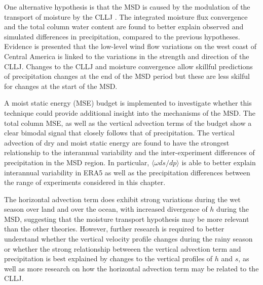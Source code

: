 One alternative hypothesis is that the MSD is caused by the modulation of the transport of moisture by the CLLJ \citep{herrera2015,zermeno2019,martinez2019}. The integrated moisture flux convergence and the total column water content are found to better explain observed and simulated differences in precipitation, compared to the previous hypotheses. Evidence is presented that the low-level wind flow variations on the west coast of Central America is linked to the variations in the strength and direction of the CLLJ. 
Changes to the CLLJ and moisture convergence allow skillful predictions of precipitation changes at the end of the MSD period but these are less skilful for changes at the start of the MSD. 


A moist static energy (MSE) budget is implemented to investigate whether this technique could provide additional insight into the mechanisms of the MSD. The total column MSE, as well as the vertical advection terms of the budget show a clear bimodal signal that closely follows that of precipitation. The vertical advection of dry and moist static energy are found to have the strongest relationship to the interannual variability and the inter-experiment differences of precipitation in the MSD region. 
In particular, $\langle \omega ds/dp \rangle$ is able to better explain interannual variability in ERA5 as well as the precipitation differences between the range of experiments considered in this chapter. 

The horizontal advection term does exhibit strong variations during the wet season over land and over the ocean, with increased divergence of $h$ during the MSD, suggesting that the moisture transport hypothesis may be more relevant than the other theories. 
However, further research is required to better understand whether the vertical velocity profile changes during the rainy season or whether the strong relationship betweeen the vertical advection term and precipitation is best explained by changes to the vertical profiles of $h$ and $s$, as well as more research on how the horizontal advection term may be related to the CLLJ.
 
 

